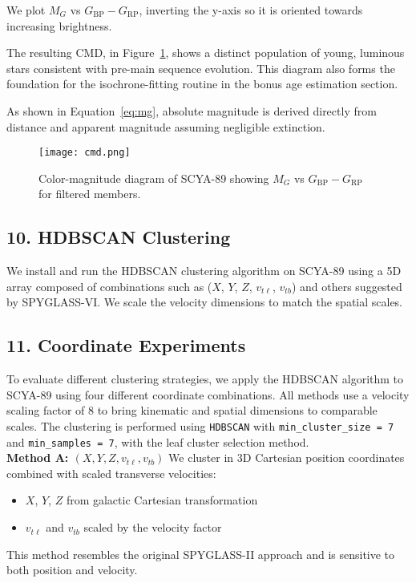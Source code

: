 \documentclass[11pt]{article}
\begin{document}
We plot $M_G$ vs $G_{\text{BP}} - G_{\text{RP}}$, inverting the y-axis so it is oriented towards increasing brightness.

The resulting CMD, in Figure~\ref{fig:cmd}, shows a distinct population of young, luminous stars consistent with pre-main sequence evolution. This diagram also forms the foundation for the isochrone-fitting routine in the bonus age estimation section.

As shown in Equation~\ref{eq:mg}, absolute magnitude is derived directly from distance and apparent magnitude assuming negligible extinction.

\begin{figure}[H]
    \centering
    \texttt{[image: cmd.png]}
    \caption{Color-magnitude diagram of SCYA-89 showing $M_G$ vs $G_{\text{BP}} - G_{\text{RP}}$ for filtered members.}
    \label{fig:cmd}
\end{figure}


\subsection*{10. HDBSCAN Clustering}
We install and run the HDBSCAN clustering algorithm on SCYA-89 using a 5D array composed of combinations such as ($X$, $Y$, $Z$, $v_{t\ell}$, $v_{tb}$) and others suggested by SPYGLASS-VI. We scale the velocity dimensions to match the spatial scales.


\subsection*{11. Coordinate Experiments}
To evaluate different clustering strategies, we apply the HDBSCAN algorithm to SCYA-89 using four different coordinate combinations. All methods use a velocity scaling factor of 8 to bring kinematic and spatial dimensions to comparable scales. The clustering is performed using \texttt{HDBSCAN} with \texttt{min\_cluster\_size = 7} and \texttt{min\_samples = 7}, with the leaf cluster selection method.\\

\textbf{Method A: $(X, Y, Z, v_{t\ell}, v_{tb})$}
We cluster in 3D Cartesian position coordinates combined with scaled transverse velocities:
\begin{itemize}
  \item $X$, $Y$, $Z$ from galactic Cartesian transformation
  \item $v_{t\ell}$ and $v_{tb}$ scaled by the velocity factor
\end{itemize}
This method resembles the original SPYGLASS-II approach and is sensitive to both position and velocity.\\
\end{document}
